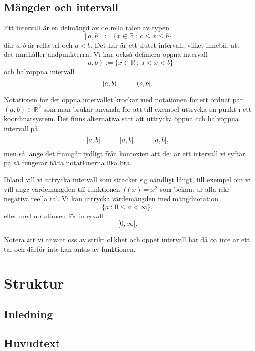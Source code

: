 \documentclass[titlepage]{article}
\begin{document}

\subsection{Mängder och intervall}

Ett intervall är en delmängd av de rella talen av typen
$$[a,b] := \{x \in \mathbb{R}\: : \: a\leq x \leq b\}$$
där $a,b$ är rella tal och $a<b$. Det här är ett slutet intervall, vilket innebär att det innehåller ändpunkterna. Vi kan också definiera öppna intervall 
$$(a,b) := \{x \in \mathbb{R} \: : \: a<x<b\}$$
och halvöppna intervall
$$[a,b) \hspace{10mm} (a,b].$$

Notationen för det öppna intervallet krockar med notationen för ett ordnat par $(a,b) \in \mathbb{R}^2$ som man brukar använda för att till exempel uttrycka en punkt i ett koordinatsystem. Det finns alternativa sätt att uttrycka öppna och halvöppna intervall på
$$]a,b[ \hspace{10mm} [a,b[ \hspace{10mm} ]a,b],$$
men så länge det framgår tydligt från kontexten att det är ett intervall vi syftar på så fungerar båda notationerna lika bra.

Ibland vill vi uttrycka intervall som sträcker sig oändligt långt, till exempel om vi vill ange värdemängden till funktionen $f(x) = x^2$ som bekant är alla icke-negativa reella tal. Vi kan uttrycka värdemängden med mängdnotation
$$\{ a \: : \: 0 \leq a < \infty \},$$
eller med notationen för intervall
$$[0, \infty[.$$

Notera att vi använt oss av strikt olikhet och öppet intervall här då $\infty$ inte är ett tal och därför inte kan antas av funktionen.





\section{Struktur}

\subsection{Inledning}

\subsection{Huvudtext}
\end{document}
